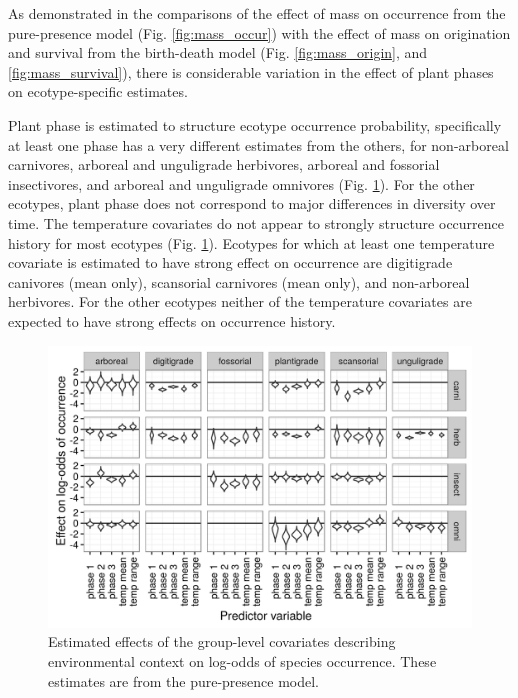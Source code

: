 \documentclass[12pt,letterpaper]{article}
\begin{document}
As demonstrated in the comparisons of the effect of mass on occurrence from the pure-presence model (Fig. \ref{fig:mass_occur}) with the effect of mass on origination and survival from the birth-death model (Fig. \ref{fig:mass_origin}, and \ref{fig:mass_survival}), there is considerable variation in the effect of plant phases on ecotype-specific estimates.

Plant phase is estimated to structure ecotype occurrence probability, specifically at least one phase has a very different estimates from the others, for non-arboreal carnivores, arboreal and unguligrade herbivores, arboreal and fossorial insectivores, and arboreal and unguligrade omnivores (Fig. \ref{fig:group_pure_presence}). For the other ecotypes, plant phase does not correspond to major differences in diversity over time. 
The temperature covariates do not appear to strongly structure occurrence history for most ecotypes (Fig. \ref{fig:group_pure_presence}). Ecotypes for which at least one temperature covariate is estimated to have strong effect on occurrence are digitigrade canivores (mean only), scansorial carnivores (mean only), and non-arboreal herbivores. For the other ecotypes neither of the temperature covariates are expected to have strong effects on occurrence history.

  \begin{figure}[ht]
  \centering
  \includegraphics[width=\textwidth,height=0.5\textheight,keepaspectratio=true]{figure/group_on_ecotype}
  \caption[Effects of group-level covariates on log-odds of ecotype occurrence as estimated from the the pure-presence model]{Estimated effects of the group-level covariates describing environmental context on log-odds of species occurrence. These estimates are from the pure-presence model.} 
  \label{fig:group_pure_presence}
\end{figure}
\end{document}
